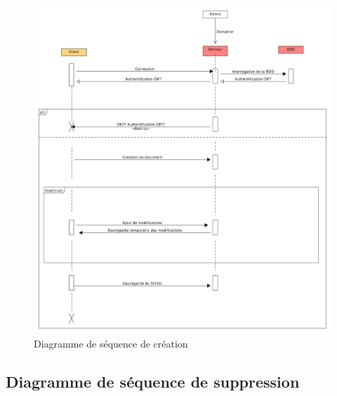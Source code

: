 	\begin{figure}[hb]
	\centering
	\includegraphics[scale=.32]{setup/diagramme_sequence_creation.png}
	
	\caption{Diagramme de séquence de création}
	\end{figure}
	
	\newpage
	
	\subsection{Diagramme de séquence de suppression}
	
